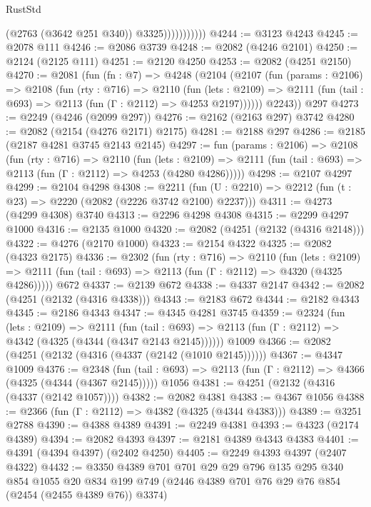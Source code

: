 \begin{lexlean}{RustStd}
\begin{coremodule}
                          (@2763 (@3642 @251 @340))
                          @3325)))))))))))
@4244 := @3123 @4243
@4245 := @2078 @111
@4246 := @2086 @3739
@4248 := @2082 (@4246 @2101)
@4250 := @2124 (@2125 @111)
@4251 := @2120 @4250
@4253 := @2082 (@4251 @2150)
@4270 := @2081
    (fun (fn : @7) =>
    @4248
      (@2104
        (@2107
          (fun (params : @2106) =>
          @2108
            (fun (rty : @716) =>
            @2110
              (fun (lets : @2109) =>
              @2111 (fun (tail : @693) => @2113 (fun (Γ : @2112) => @4253 @2197))))))
        @2243))
    @297
@4273 := @2249 (@4246 (@2099 @297))
@4276 := @2162 (@2163 @297) @3742
@4280 := @2082 (@2154 (@4276 @2171) @2175)
@4281 := @2188 @297
@4286 := @2185 (@2187 @4281 @3745 @2143 @2145)
@4297 := fun (params : @2106) =>
  @2108
    (fun (rty : @716) =>
    @2110
      (fun (lets : @2109) =>
      @2111 (fun (tail : @693) => @2113 (fun (Γ : @2112) => @4253 (@4280 @4286)))))
@4298 := @2107 @4297
@4299 := @2104 @4298
@4308 := @2211 (fun (U : @2210) => @2212 (fun (t : @23) => @2220 (@2082 (@2226 @3742 @2100) @2237)))
@4311 := @4273 (@4299 @4308) @3740
@4313 := @2296 @4298 @4308
@4315 := @2299 @4297 @1000
@4316 := @2135 @1000
@4320 := @2082 (@4251 (@2132 (@4316 @2148)))
@4322 := @4276 (@2170 @1000)
@4323 := @2154 @4322
@4325 := @2082 (@4323 @2175)
@4336 := @2302
    (fun (rty : @716) =>
    @2110
      (fun (lets : @2109) =>
      @2111 (fun (tail : @693) => @2113 (fun (Γ : @2112) => @4320 (@4325 @4286)))))
    @672
@4337 := @2139 @672
@4338 := @4337 @2147
@4342 := @2082 (@4251 (@2132 (@4316 @4338)))
@4343 := @2183 @672
@4344 := @2182 @4343
@4345 := @2186 @4343
@4347 := @4345 @4281 @3745
@4359 := @2324
    (fun (lets : @2109) =>
    @2111
      (fun (tail : @693) => @2113 (fun (Γ : @2112) => @4342 (@4325 (@4344 (@4347 @2143 @2145))))))
    @1009
@4366 := @2082 (@4251 (@2132 (@4316 (@4337 (@2142 (@1010 @2145))))))
@4367 := @4347 @1009
@4376 := @2348
    (fun (tail : @693) => @2113 (fun (Γ : @2112) => @4366 (@4325 (@4344 (@4367 @2145)))))
    @1056
@4381 := @4251 (@2132 (@4316 (@4337 (@2142 @1057))))
@4382 := @2082 @4381
@4383 := @4367 @1056
@4388 := @2366 (fun (Γ : @2112) => @4382 (@4325 (@4344 @4383)))
@4389 := @3251 @2788
@4390 := @4388 @4389
@4391 := @2249 @4381
@4393 := @4323 (@2174 @4389)
@4394 := @2082 @4393
@4397 := @2181 @4389 @4343 @4383
@4401 := @4391 (@4394 @4397) (@2402 @4250)
@4405 := @2249 @4393 @4397 (@2407 @4322)
@4432 := @3350
    @4389
    @701
    @701
    @29
    @29
    @796
    @135
    @295
    @340
    @854
    @1055
    @20
    @834
    @199
    @749
    (@2446 @4389 @701 @76 @29 @76 @854 (@2454 (@2455 @4389 @76)) @3374)

\end{coremodule}
\end{lexlean}
